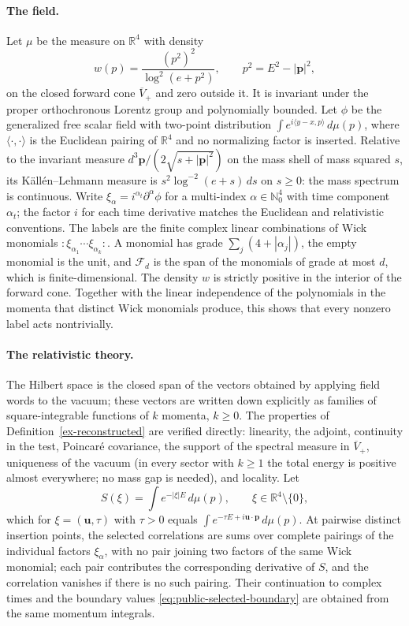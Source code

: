 \paragraph{The field.}
Let \(\mu\) be the measure on \(\mathbb R^4\) with density
\[
 w(p)=\frac{(p^2)^2}{\log^2(e+p^2)},\qquad p^2=E^2-|\boldsymbol p|^2,
\]
on the closed forward cone \(\overline V_+\) and zero outside it. It is
invariant under the proper orthochronous Lorentz group and polynomially
bounded. Let \(\phi\) be the generalized free scalar field with two-point
distribution \(\int e^{i\langle y-x,p\rangle}\,d\mu(p)\), where
\(\langle\cdot,\cdot\rangle\) is the Euclidean pairing of \(\mathbb R^4\) and
no normalizing factor is inserted. Relative to the invariant measure
\(d^3\boldsymbol p/(2\sqrt{s+|\boldsymbol p|^2})\) on the mass shell of mass
squared \(s\), its K\"all\'en--Lehmann measure is
\(s^2\log^{-2}(e+s)\,ds\) on \(s\ge0\): the mass spectrum is continuous. Write
\(\xi_\alpha=i^{\alpha_t}\partial^\alpha\phi\) for a multi-index
\(\alpha\in\mathbb N_0^4\) with time component \(\alpha_t\); the factor \(i\)
for each time derivative matches the Euclidean and relativistic conventions.
The labels are the finite complex linear combinations of Wick monomials
\(:\!\xi_{\alpha_1}\cdots\xi_{\alpha_k}\!:\). A monomial has grade
\(\sum_j(4+|\alpha_j|)\), the empty monomial is the unit, and
\(\mathcal F_d\) is the span of the monomials of grade at most \(d\), which
is finite-dimensional. The density \(w\) is strictly positive in the interior
of the forward cone. Together with the linear independence of the
polynomials in the momenta that distinct Wick monomials produce, this shows
that every nonzero label acts nontrivially.

\paragraph{The relativistic theory.}
The Hilbert space is the closed span of the vectors obtained by applying field
words to the vacuum; these vectors are written down explicitly as families of
square-integrable functions of \(k\) momenta, \(k\ge0\). The properties of
Definition~\ref{ex-reconstructed} are verified directly: linearity, the
adjoint, continuity in the test, Poincar\'e covariance, the support of the
spectral measure in \(\overline V_+\), uniqueness of the vacuum (in every
sector with \(k\ge1\) the total energy is positive almost everywhere; no mass
gap is needed), and locality. Let
\[
 S(\xi)=\int e^{-|\xi|E}\,d\mu(p),\qquad \xi\in\mathbb R^4\setminus\{0\},
\]
which for \(\xi=(\boldsymbol u,\tau)\) with \(\tau>0\) equals
\(\int e^{-\tau E+i\boldsymbol u\cdot\boldsymbol p}\,d\mu(p)\). At pairwise
distinct insertion points, the selected correlations are sums over complete
pairings of the individual factors \(\xi_\alpha\), with no pair joining two
factors of the same Wick monomial; each pair contributes the corresponding
derivative of \(S\), and the correlation vanishes if there is no such
pairing. Their continuation to complex times and the boundary values
\eqref{eq:public-selected-boundary} are obtained from the same momentum
integrals.

